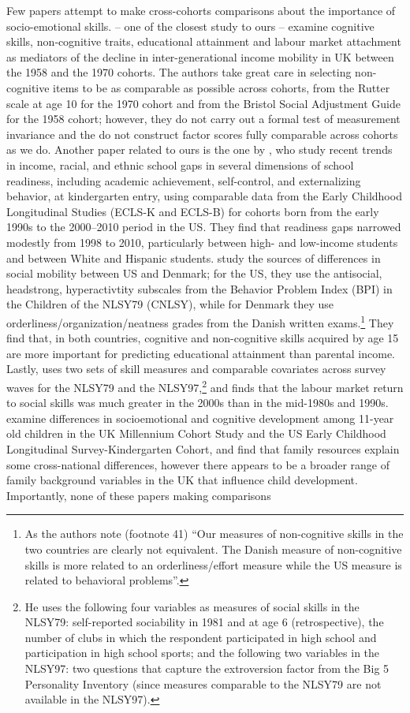 Few papers attempt to make cross-cohorts comparisons about the importance of socio-emotional skills. \citet{Blanden2007} -- one of the closest study to ours -- examine cognitive skills, non‐cognitive traits, educational attainment and labour market attachment as mediators of the decline in inter-generational income mobility in UK between the 1958 and the 1970 cohorts. The authors take great care in selecting non-cognitive items to be as comparable as possible across cohorts, from the Rutter scale at age 10 for the 1970 cohort and from the Bristol Social Adjustment Guide for the 1958 cohort; however, they do not carry out a formal test of measurement invariance and the do not construct factor scores fully comparable across cohorts as we do. Another paper related to ours is the one by \citet{Reardon2016}, who study recent trends in income, racial, and ethnic school gaps in several dimensions of school readiness, including academic achievement, self-control, and externalizing behavior, at kindergarten entry, using comparable data from the Early Childhood Longitudinal Studies (ECLS-K and ECLS-B) for cohorts born from the early 1990s to the 2000–2010 period in the US. They find that readiness gaps narrowed modestly from 1998 to 2010, particularly between high- and low-income students and between White and Hispanic students. \citet{Landerso2017a} study the sources of differences in social mobility between US and Denmark; for the US, they use the antisocial, headstrong, hyperactivtity subscales from the Behavior Problem Index (BPI) in the Children of the NLSY79 (CNLSY), while for Denmark they use orderliness/organization/neatness grades from the Danish written exams.\footnote{As the authors note (footnote 41) ``Our measures of non-cognitive skills in the two countries are clearly not equivalent. The Danish measure of non-cognitive skills is more related to an orderliness/effort measure while the US measure is related to behavioral problems''.} They find that, in both countries, cognitive and non-cognitive skills acquired by age 15 are more important for predicting educational attainment than parental income. Lastly, \citet{Deming2017} uses two sets of skill measures and comparable covariates across survey waves for the NLSY79 and the NLSY97,\footnote{He uses the following four variables as measures of social skills in the NLSY79: self-reported sociability in 1981 and at age 6 (retrospective), the number of clubs in which the respondent participated in high school and participation in high school sports; and the following two variables in the NLSY97: two questions that capture the extroversion factor from the Big 5 Personality Inventory (since measures comparable to the NLSY79 are not available in the NLSY97).} and finds that the labour market return to social skills was much greater in the 2000s than in the mid-1980s and 1990s. \citet{Zilanawala2019} examine differences in socioemotional and cognitive development among 11-year old children in the UK Millennium Cohort Study and the US Early Childhood Longitudinal Survey-Kindergarten Cohort, and find that family resources explain some cross-national differences, however there appears to be a broader range of family background variables in the UK that influence child development. Importantly, none of these papers making comparisons 
